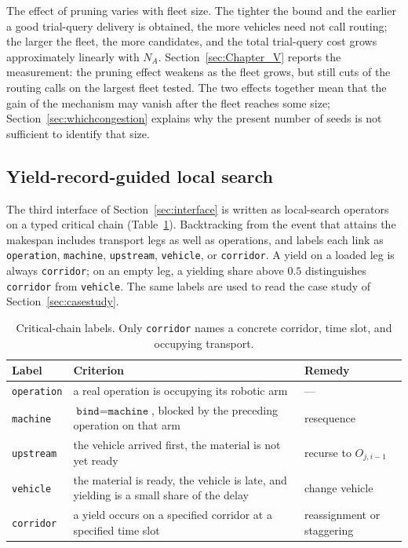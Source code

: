 The effect of pruning varies with fleet size.
The tighter the bound and the earlier a good trial-query delivery is obtained, the more vehicles need not call routing; the larger the fleet, the more candidates, and the total trial-query cost grows approximately linearly with $N_A$.
Section~\ref{sec:Chapter_V} reports the measurement: the pruning effect weakens as the fleet grows, but still cuts \RouteCallCutLo{} of the routing calls on the largest fleet tested.
The two effects together mean that the gain of the mechanism may vanish after the fleet reaches some size; Section~\ref{sec:whichcongestion} explains why the present number of seeds is not sufficient to identify that size.

\subsection{Yield-record-guided local search}
\label{sec:ls}

The third interface of Section~\ref{sec:interface} is written as local-search operators on a typed critical chain (Table~\ref{tab:attrib}).
Backtracking from the event that attains the makespan includes transport legs as well as operations, and labels each link as \texttt{operation}, \texttt{machine}, \texttt{upstream}, \texttt{vehicle}, or \texttt{corridor}.
A yield on a loaded leg is always \texttt{corridor}; on an empty leg, a yielding share above $0.5$ distinguishes \texttt{corridor} from \texttt{vehicle}.
The same labels are used to read the case study of Section~\ref{sec:casestudy}.

\begin{table}[t]
  \caption{Critical-chain labels.
  Only \texttt{corridor} names a concrete corridor, time slot, and occupying transport.}
\label{tab:attrib}
\footnotesize
\begin{tabular}{@{}llp{2.55cm}@{}}
\toprule
Label & Criterion & Remedy \\
\midrule
\texttt{operation} & a real operation is occupying its robotic arm & --- \\
\texttt{machine} & $\texttt{bind}=\texttt{machine}$, blocked by the preceding operation on that arm
  & resequence \\
\texttt{upstream} & the vehicle arrived first, the material is not yet ready & recurse to $O_{j,i-1}$ \\
\texttt{vehicle} & the material is ready, the vehicle is late, and yielding is a small share of the delay & change vehicle \\
\texttt{corridor} & a yield occurs on a specified corridor at a specified time slot & reassignment or staggering \\
\bottomrule
\end{tabular}
\end{table}

